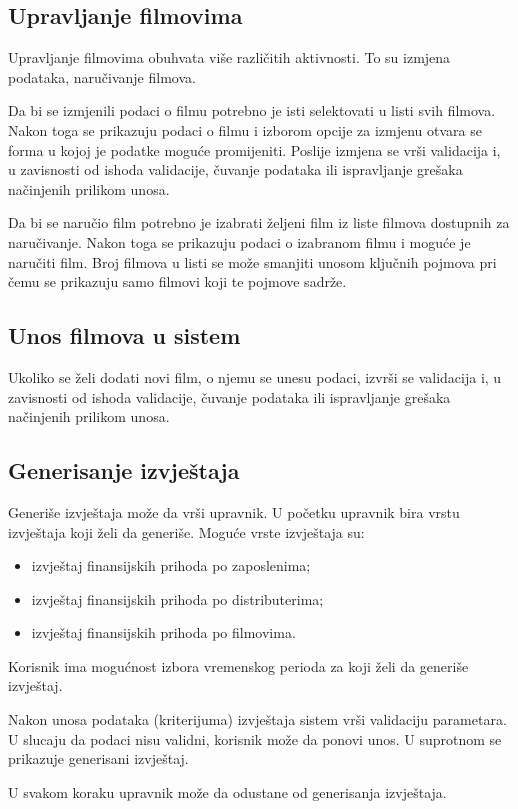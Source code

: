 \subsection{Upravljanje filmovima}
Upravljanje filmovima obuhvata više različitih aktivnosti. To su izmjena podataka, naručivanje filmova.

Da bi se izmjenili podaci o filmu potrebno je isti selektovati u listi svih filmova. Nakon toga se prikazuju podaci o filmu i 
izborom opcije za izmjenu otvara se forma u kojoj je podatke moguće promijeniti. Poslije izmjena se vrši validacija i, u zavisnosti
 od ishoda validacije, čuvanje podataka ili ispravljanje grešaka načinjenih prilikom unosa. 
 
Da bi se naručio film potrebno je izabrati željeni film iz liste filmova dostupnih za naručivanje. Nakon toga se prikazuju podaci o 
izabranom filmu i moguće je naručiti film. Broj filmova u listi se može smanjiti unosom ključnih pojmova pri čemu se prikazuju samo 
filmovi koji te pojmove sadrže.

\subsection{Unos filmova u sistem}
Ukoliko se želi dodati novi film, o njemu se unesu podaci, izvrši se validacija i, u zavisnosti od ishoda validacije, čuvanje podataka
 ili ispravljanje grešaka načinjenih prilikom unosa.

\subsection{Generisanje izvještaja}
Generiše izvještaja može da vrši upravnik. U početku upravnik bira vrstu izvještaja koji želi da generiše. Moguće vrste izvještaja su: 
\begin{itemize}
\item izvještaj finansijskih prihoda po zaposlenima;
\item izvještaj finansijskih prihoda po distributerima;
\item izvještaj finansijskih prihoda po filmovima.
\end{itemize}
Korisnik ima mogućnost izbora vremenskog perioda za koji želi da generiše izvještaj.

Nakon unosa podataka (kriterijuma) izvještaja sistem vrši validaciju parametara. U slucaju da podaci nisu validni, korisnik može da ponovi unos. U suprotnom se prikazuje generisani izvještaj.

U svakom koraku upravnik može da odustane od generisanja izvještaja.

